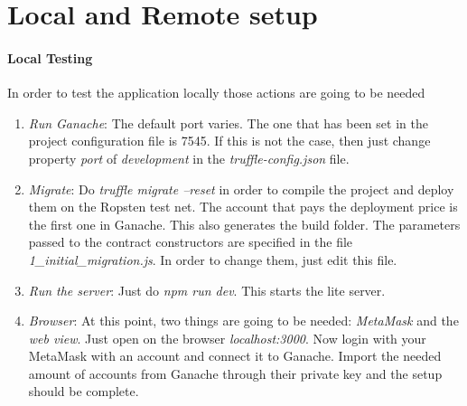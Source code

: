 \documentclass[11pt, a4paper]{report}
\begin{document}
\section*{Local and Remote setup}
	\paragraph*{Local Testing}
	In order to test the application locally those actions are going to be needed
	\begin{enumerate}
		\item \emph{Run Ganache}: The default port varies. The one that has been set in the project configuration file is 7545. If this is not the case, then just change property \emph{port} of \emph{development} in the \emph{truffle-config.json} file.
		\item \emph{Migrate}: Do \emph{truffle migrate --reset} in order to compile the project and deploy them on the Ropsten test net. The account that pays the deployment price is the first one in Ganache. This also generates the build folder. The parameters passed to the contract constructors are specified in the file \emph{1\_initial\_migration.js}. In order to change them, just edit this file.
		\item \emph{Run the server}: Just do \emph{npm run dev}. This starts the lite server.
		\item \emph{Browser}: At this point, two things are going to be needed: \emph{MetaMask} and the \emph{web view}. Just open on the browser \emph{localhost:3000}. Now login with your MetaMask with an account and connect it to Ganache. Import the needed amount of accounts from Ganache through their private key and the setup should be complete.
	\end{enumerate}
\end{document}
